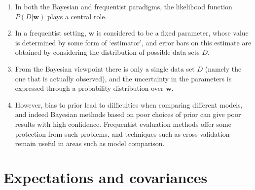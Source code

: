 \begin{enumerate}
    \item In both the Bayesian and frequentist paradigms, the likelihood function $P(D|\bm{w})$ plays a central role.
    \hfill \cite{ml/book/Pattern-Recognition-And-Machine-Learning/Christopher-M-Bishop}

    \item In a frequentist setting, $\bm{w}$ is considered to be a fixed parameter, whose value is determined by some form of ‘estimator’, and error bars on this estimate are obtained by considering the distribution of possible data sets $D$.
    \hfill \cite{ml/book/Pattern-Recognition-And-Machine-Learning/Christopher-M-Bishop}

    \item From the Bayesian viewpoint there is only a single data set $D$ (namely the one that is actually observed), and the uncertainty in the parameters is expressed through a probability distribution over $\bm{w}$.
    \hfill \cite{ml/book/Pattern-Recognition-And-Machine-Learning/Christopher-M-Bishop}

    \item However, bias to prior lead to difficulties when comparing different models, and indeed Bayesian methods based on poor choices of prior can give poor results with high confidence.
    Frequentist evaluation methods offer some protection from such problems, and techniques such as cross-validation remain useful in areas such as model comparison.
    \hfill \cite{ml/book/Pattern-Recognition-And-Machine-Learning/Christopher-M-Bishop}


\end{enumerate}








\section{Expectations and covariances}

